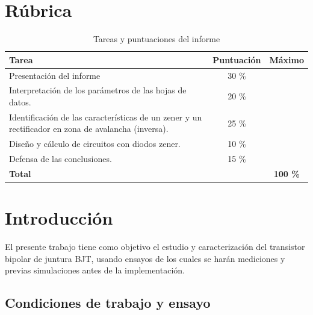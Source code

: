 \valentinoQuitaLasColumnas{}
\section{Rúbrica}
\begin{table}[h!]
\centering
\renewcommand{\arraystretch}{1.5}
\begin{tabular}{|>{\raggedright}p{8cm}|c|c|}
\hline
\rowcolor[HTML]{D9D9D9}
\textbf{Tarea} & \textbf{Puntuación} & \textbf{Máximo} \\
\hline
\cellcolor[HTML]{E6E6E6} Presentación del informe & 30 \% & \\
\hline
\cellcolor[HTML]{E6E6E6} Interpretación de los parámetros de las hojas de datos. & 20 \% & \\
\hline
\cellcolor[HTML]{E6E6E6} Identificación de las características de un zener y un rectificador en zona de avalancha (inversa). & 25 \% & \\
\hline
\cellcolor[HTML]{E6E6E6} Diseño y cálculo de circuitos con diodos zener. & 10 \% & \\
\hline
\cellcolor[HTML]{E6E6E6} Defensa de las conclusiones. & 15 \% & \\
\hline
\rowcolor[HTML]{C0C0C0} \textbf{Total} & & \textbf{100 \%} \\
\hline
\end{tabular}
\caption{Tareas y puntuaciones del informe}
\end{table}

\valentinoPoneLasColumnas{}
\thispagestyle{fancy}
\section{Introducción}
\sangria{} El presente trabajo tiene como objetivo el estudio y caracterización del transistor bipolar de juntura BJT, usando ensayos de los cuales se harán mediciones y previas simulaciones antes de la implementación.

\subsection{Condiciones de trabajo y ensayo}


